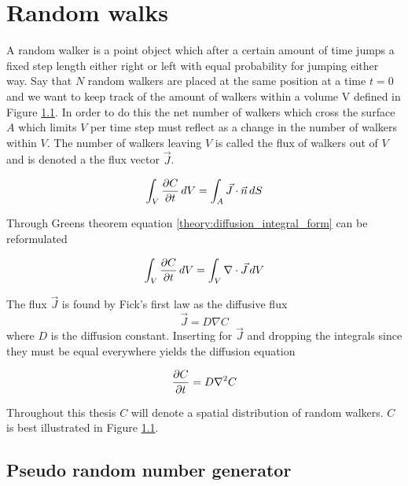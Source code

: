 \section{Random walks}

A random walker is a point object which after a certain amount of time jumps a fixed step length either right or left with equal probability for jumping either way. 
Say that $N$ random walkers are placed at the same position at a time $t=0$ and we want to keep track of the amount of walkers within a volume V defined in Figure \ref{}. 
In order to do this the net number of walkers which cross the surface $A$ which limits $V$ per time step must reflect as a change in the number of walkers within $V$. 
The number of walkers leaving $V$ is called the flux of walkers out of $V$ and is denoted a the flux vector $\vec{J}$. 

\begin{equation}\label{theory:diffusion_integral_form}
 \int_V \frac{\partial C}{\partial t}\,dV = \int_A\vec{J}\cdot \vec{n}\,dS
\end{equation}

Through Greens theorem equation \eqref{theory:diffusion_integral_form} can be reformulated

\begin{equation}
 \int_V \frac{\partial C}{\partial t}\,dV = \int_V\nabla\cdot\vec{J}\,dV
\end{equation}

The flux $\vec{J}$ is found by Fick's first law as the diffusive flux 
\begin{equation}
 \vec J = D\nabla C
\end{equation}
where $D$ is the diffusion constant. Inserting for $\vec J$ and dropping the integrals since they must be equal everywhere yields the diffusion equation

\begin{equation}\label{theory:diffusion_equation}
 \frac{\partial C}{\partial t} = D\nabla^2 C
\end{equation}

Throughout this thesis $C$ will denote a spatial distribution of random walkers. 
$C$ is best illustrated in Figure \ref{}.


\subsection{Pseudo random number generator}

